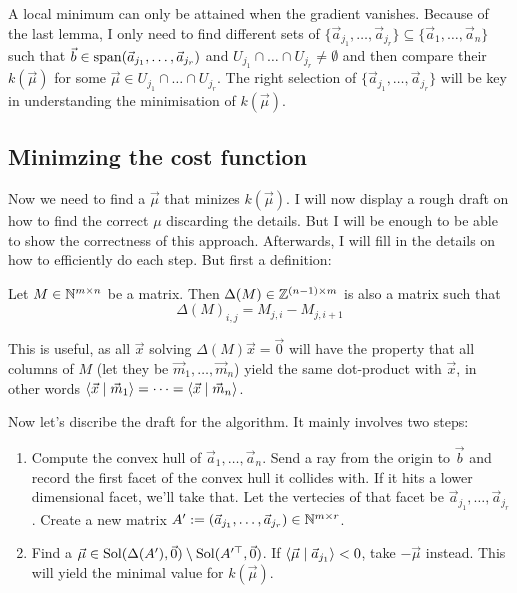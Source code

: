 A local minimum can only be attained when the gradient vanishes. Because of the last lemma, I only need to find different sets of $\{\vec a_{j_1}, \dots, \vec a_{j_r}\} \subseteq \{\vec a_1, \dots, \vec a_n\}$ such that $\vec b \in \operatorname{span}(\vec a_{j_1}, \dots, \vec a_{j_r})$ and $U_{j_1} \cap \dots \cap U_{j_r} \neq \emptyset$ and then compare their $k(\vec\mu)$ for some $\vec\mu \in U_{j_1} \cap \dots \cap U_{j_r}$. The right selection of $\{\vec a_{j_1}, \dots, \vec a_{j_r}\}$ will be key in understanding the minimisation of $k(\vec\mu)$. 

\subsection{Minimzing the cost function}
Now we need to find a $\vec\mu$ that minizes $k(\vec\mu)$. I will now display a rough draft on how to find the correct $\mu$ discarding the details. But I will be enough to be able to show the correctness of this approach. Afterwards, I will fill in the details on how to efficiently do each step. But first a definition:
\begin{definition}
    Let $M \in \mathbb{N}^{m\times n}$ be a matrix. Then $\Delta(M) \in \mathbb{Z}^{(n-1)\times m}$ is also a matrix such that 
    $$\Delta(M)_{i,j} = M_{j,i} - M_{j,i+1}$$
\end{definition}
\begin{observation}
    \label{obs:delta_meaning}
    This is useful, as all $\vec x$ solving $\Delta(M)\vec x = \vec 0$ will have the property that all columns of $M$ (let they be $\vec m_1, \dots, \vec m_n$) yield the same dot-product with $\vec x$, in other words $\langle \vec x \mid \vec m_1 \rangle = \dots = \langle \vec x \mid \vec m_n \rangle$.
\end{observation}

Now let's discribe the draft for the algorithm. It mainly involves two steps:
\begin{algorithm}
    \label{algo}
    \begin{enumerate}
        \item Compute the convex hull of $\vec a_1, \dots, \vec a_n$. Send a ray from the origin to $\vec b$ and record the first facet of the convex hull it collides with. If it hits a lower dimensional facet, we'll take that. Let the vertecies of that facet be $\vec a_{j_1}, \dots, \vec a_{j_r}$. Create a new matrix $A' := (\vec a_{j_1}, \dots, \vec a_{j_r}) \in \mathbb{N}^{m \times r}$.
        \item Find a $\vec\mu \in \operatorname{Sol}(\Delta(A'), \vec0) \setminus \operatorname{Sol}(A'^\top, \vec0)$. If $\langle \vec\mu \mid \vec a_{j_1} \rangle<0$, take $-\vec\mu$ instead. This will yield the minimal value for $k(\vec\mu)$.
    \end{enumerate}
\end{algorithm}

